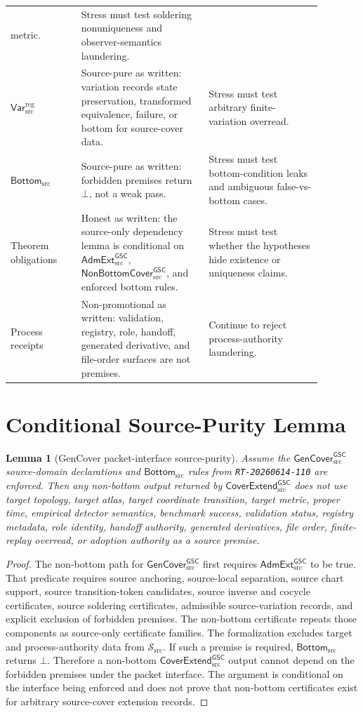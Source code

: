 \documentclass[11pt]{article}
\newcommand{\GenCover}{\mathsf{GenCover}_{\mathrm{src}}^{\mathsf{GSC}}}
\newcommand{\AdmExt}{\mathsf{AdmExt}_{\mathrm{src}}^{\mathsf{GSC}}}
\newcommand{\CoverExt}{\mathsf{CoverExtend}_{\mathrm{src}}^{\mathsf{GSC}}}
\newcommand{\NonBottom}{\mathsf{NonBottomCover}_{\mathrm{src}}^{\mathsf{GSC}}}
\newcommand{\BottomSrc}{\mathsf{Bottom}_{\mathrm{src}}}
\newcommand{\VarRegSrc}{\mathsf{Var}^{\mathrm{reg}}_{\mathrm{src}}}
\newcommand{\Bot}{\bot}
\newtheorem{lemma}{Lemma}
\begin{document}
\begin{center}
\begin{tabular}{p{0.20\linewidth}p{0.36\linewidth}p{0.32\linewidth}}
metric. &
Stress must test soldering nonuniqueness and observer-semantics laundering. \\
\(\VarRegSrc\) &
Source-pure as written: variation records state preservation, transformed
equivalence, failure, or bottom for source-cover data. &
Stress must test arbitrary finite-variation overread. \\
\(\BottomSrc\) &
Source-pure as written: forbidden premises return \(\Bot\), not a weak pass. &
Stress must test bottom-condition leaks and ambiguous false-vs-bottom cases. \\
Theorem obligations &
Honest as written: the source-only dependency lemma is conditional on
\(\AdmExt\), \(\NonBottom\), and enforced bottom rules. &
Stress must test whether the hypotheses hide existence or uniqueness claims. \\
Process receipts &
Non-promotional as written: validation, registry, role, handoff, generated
derivative, and file-order surfaces are not premises. &
Continue to reject process-authority laundering. \\
\hline
\end{tabular}
\end{center}

\section{Conditional Source-Purity Lemma}

\begin{lemma}[GenCover packet-interface source-purity]
Assume the \(\GenCover\) source-domain declarations and \(\BottomSrc\) rules
from \texttt{RT-20260614-110} are enforced. Then any non-bottom output
returned by \(\CoverExt\) does not use target topology, target atlas, target
coordinate transition, target metric, proper time, empirical detector
semantics, benchmark success, validation status, registry metadata, role
identity, handoff authority, generated derivatives, file order, finite-replay
overread, or adoption authority as a source premise.
\end{lemma}

\begin{proof}
The non-bottom path for \(\GenCover\) first requires \(\AdmExt\) to be true.
That predicate requires source anchoring, source-local separation, source chart
support, source transition-token candidates, source inverse and cocycle
certificates, source soldering certificates, admissible source-variation
records, and explicit exclusion of forbidden premises. The non-bottom
certificate repeats those components as source-only certificate families.
The formalization excludes target and process-authority data from
\(\mathcal{S}_{\mathrm{src}}\). If such a premise is required, \(\BottomSrc\)
returns \(\Bot\). Therefore a non-bottom \(\CoverExt\) output cannot depend on
the forbidden premises under the packet interface. The argument is conditional
on the interface being enforced and does not prove that non-bottom
certificates exist for arbitrary source-cover extension records.
\end{proof}
\end{document}
